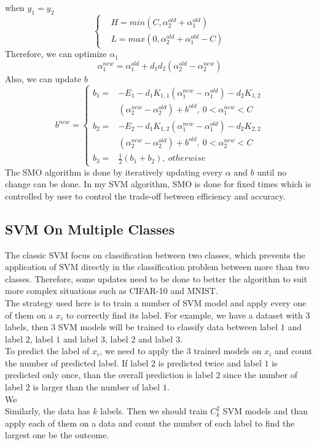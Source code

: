 \documentclass[twocolumn, a4paper]{article}
\begin{document}
when $y_1 = y_2$
\begin{equation}
\left\{
\begin{aligned}
\nonumber
&H = min(C,\alpha_2^{old}+\alpha_1^{old})\\
&L = max(0,\alpha_2^{old}+\alpha_1^{old}-C)
\end{aligned}
\right.
\end{equation}
Therefore, we can optimize $\alpha_1$
\begin{equation}
\nonumber
  \alpha_1^{new}=\alpha_1^{old}+d_1d_2(\alpha_2^{old}-\alpha_2^{new})
\end{equation}
Also, we can update $b$
\begin{equation}
b^{new}=\left\{
\begin{aligned}
\nonumber
b_1=&-E_1-d_1K_{1,1}(\alpha_1^{new}-\alpha_1^{old})-d_2K_{1,2}\\&(\alpha_2^{new}-\alpha_2^{old})+b^{old},\ 0<\alpha_1^{new}<C\\
b_2=&-E_2-d_1K_{1,2}(\alpha_1^{new}-\alpha_1^{old})-d_2K_{2,2}\\&(\alpha_2^{new}-\alpha_2^{old})+b^{old},\ 0<\alpha_2^{new}<C\\
b_3=&\frac{1}{2}(b_1+b_2),\ otherwise
\end{aligned}
\right.
\end{equation}
The SMO algorithm is done by iteratively updating every $\alpha$ and $b$ until no change can be done. In my SVM algorithm, SMO is done for fixed times which is controlled by user to control the trade-off between efficiency and accuracy.
\subsection{SVM On Multiple Classes}
The classic SVM focus on classification between two classes, which prevents the application of SVM directly in the classification problem between more than two classes. Therefore, some updates need to be done to better the algorithm to suit more complex situations such as CIFAR-10 and MNIST.\\
The strategy used here is to train a number of SVM model and apply every one of them on a $x_i$ to correctly find its label. For example, we have a dataset with $3$ labels, then $3$ SVM models will be trained to classify data between label $1$ and  label $2$, label $1$ and label $3$, label $2$ and label $3$.\\
To predict the label of $x_i$, we need to apply the 3 trained models on $x_i$ and count the number of predicted label. If label $2$ is predicted twice and label $1$ is predicted only once, than the overall prediction is label $2$ since the number of label $2$ is larger than the number of label $1$.\\
We 
\\Similarly, the data has $k$ labels. Then we should train $C_k^2$ SVM models and than apply each of them on a data and count the number of each label to find the largest one be the outcome.
\end{document}

